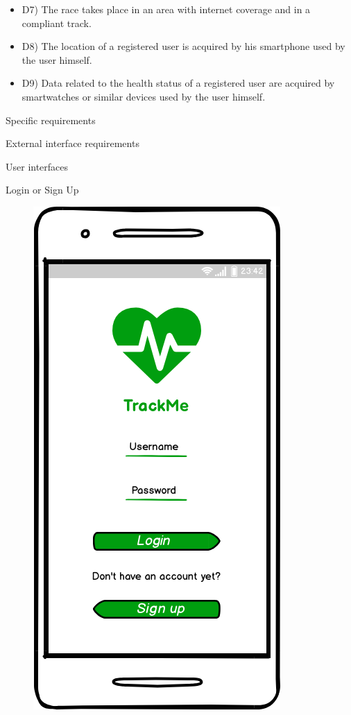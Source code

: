 \documentclass{article}
\begin{document}
\begin{legal}
\begin{legal}
\begin{legal}
{\begin{itemize}
				\item D7) The race takes place in an area with internet coverage and in a compliant track.\\
				\item D8) The location of a registered user is acquired by his smartphone used by the user himself.\\
				\item D9) Data related to the health status of a registered user are acquired by smartwatches or similar devices used by the user himself.\\
				\end{itemize}
			}
			\end{legal}
		\end{legal}
	
\newpage
	\item Specific requirements\\
  		\begin{legal}
		\item External interface requirements\\
			\begin{legal}
    			\item User interfaces \\
				\begin{legal}
    				\item Login or Sign Up 
				\begin{figure}[H]
				\centering
  				\includegraphics[scale=0.3]{./images/mockups/Login-Sign-up.png}

\end{figure}
\end{legal}
\end{legal}
\end{legal}
\end{legal}
\end{document}
